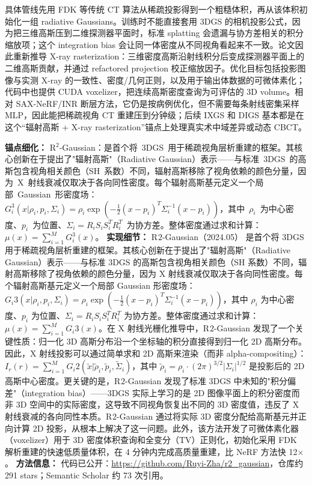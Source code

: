 具体管线先用 FDK 等传统 CT 算法从稀疏投影得到一个粗糙体积，再从该体积初始化一组 radiative Gaussians。训练时不能直接套用 3DGS 的相机投影公式，因为把三维高斯压到二维探测器平面时，标准 splatting 会遗漏与协方差相关的积分缩放项；这个 integration bias 会让同一体密度从不同视角看起来不一致。论文因此重新推导 X-ray rasterization：三维密度高斯沿射线积分后变成探测器平面上的二维高斯贡献，并通过 refactored projection 校正缩放因子。优化目标包括投影图像与实测 X-ray 的一致性、密度/几何正则，以及用于输出体数据的可微体素化；代码中也提供 CUDA voxelizer，把连续高斯密度查询为可评估的 3D volume。相对 SAX-NeRF/INR 断层方法，它仍是按病例优化，但不需要每条射线密集采样 MLP，因此能把稀疏视角 CT 重建压到分钟级；后续 IXGS 和 DIGS 基本都是在这个“辐射高斯 + X-ray rasterization”锚点上处理真实术中域差异或动态 CBCT。

\textbf{锚点细化：} R$^2$-Gaussian：是首个将~3DGS~用于稀疏视角层析重建的框架。其核心创新在于提出了"辐射高斯"（Radiative Gaussian）表示——与标准~3DGS~的高斯包含视角相关颜色（SH~系数）不同，辐射高斯移除了视角依赖的颜色分量，因为~X~射线衰减仅取决于各向同性密度。每个辐射高斯基元定义一个局部~Gaussian~形密度场：$G_i^3(x | \rho_i, p_i, \Sigma_i) = \rho_i \exp(-\frac{1}{2}(x - p_i)^T \Sigma_i^{-1}(x - p_i))$，其中~$\rho_i$~为中心密度、$p_i$~为位置、$\Sigma_i = R_i S_i S_i^T R_i^T$~为协方差。整体密度通过求和计算：$\mu(x) = \sum_{i=1}^{M} G_i^3(x)$。
\textbf{实现细节：} R$^{}2$-Gaussian（2024.05） 是首个将 3DGS 用于稀疏视角层析重建的框架。其核心创新在于提出了"辐射高斯"（Radiative Gaussian）表示——与标准 3DGS 的高斯包含视角相关颜色（SH 系数）不同，辐射高斯移除了视角依赖的颜色分量，因为 X 射线衰减仅取决于各向同性密度。每个辐射高斯基元定义一个局部 Gaussian 形密度场：$G_i^{}3(x | \rho_i, p_i, \Sigma_i) = \rho_i \exp(-\frac{1}{2}(x - p_i)^T \Sigma_i^{-1}(x - p_i))$，其中 $\rho_i$ 为中心密度、$p_i$ 为位置、$\Sigma_i = R_i S_i S_i^T R_i^T$ 为协方差。整体密度通过求和计算：$\mu(x) = \sum_{i=1}^{M} G_i^{}3(x)$。在 X 射线光栅化推导中，R$^{}2$-Gaussian 发现了一个关键性质：归一化 3D 高斯分布沿一个坐标轴的积分直接得到归一化 2D 高斯分布。因此，X 射线投影可以通过简单求和 2D 高斯来渲染（而非 alpha-compositing）：$I_r(r) = \sum_{i=1}^{M} G_i^{}2(\tilde{x} | \tilde{\rho}_i, \tilde{p}_i, \tilde{\Sigma}_i)$，其中 $\tilde{\rho}_i = \rho_i \cdot (2\pi)^{3/2}|\Sigma_i|^{1/2}$ 是投影后的 2D 高斯中心密度。更关键的是，R$^{}2$-Gaussian 发现了标准 3DGS 中未知的"积分偏差"（integration bias）——3DGS 实际上学习的是 2D 图像平面上的积分密度而非 3D 空间中的实际密度，这导致不同视角恢复出不同的 3D 密度值，违反了 X 射线衰减的各向同性本质。R$^{}2$-Gaussian 通过将实际 3D 密度分配给高斯基元并正向计算 2D 投影，从根本上解决了这一问题。此外，该方法开发了可微体素化器（voxelizer）用于 3D 密度体积查询和全变分（TV）正则化，初始化采用 FDK 解析重建的快速低质量体积，在 4 分钟内完成高质量重建，比 NeRF 方法快 12$\times$。
\textbf{方法信息：} 代码已公开：\url{https://github.com/Ruyi-Zha/r2_gaussian}，仓库约 291 stars；Semantic Scholar 约 73 次引用。



